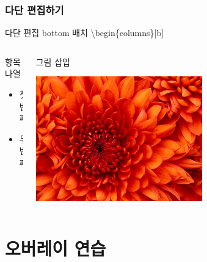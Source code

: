\documentclass[ aspectratio=169,  10pt,blue,xcolor=pdftex,dvipsnames,table,handout,notes]{beamer}
\begin{document}
		\begin{frame}[t]
		\frametitle{다단 편집하기}

			\begin{example} {다단 편집 bottom 배치}
			\textbackslash begin\{columns\}[b]
			\end{example}

		\begin{columns}[b]
		\begin{column}{.5\textwidth}

			\begin{block} {항목 나열}
			\begin{itemize}
			\item 첫 번째
			\item 두 번째
			\end{itemize}
			\end{block}

		\end{column}

		\begin{column}{.4\textwidth}

			\begin{block} {그림 삽입}
			\centerline{\includegraphics[scale=1.0,width=0.6\textwidth]{./fig/Chrysanthemum.jpg}}
			\end{block}

		\end{column}
		\end{columns}
		\end{frame}






		\section{오버레이 연습} 
\end{document}
